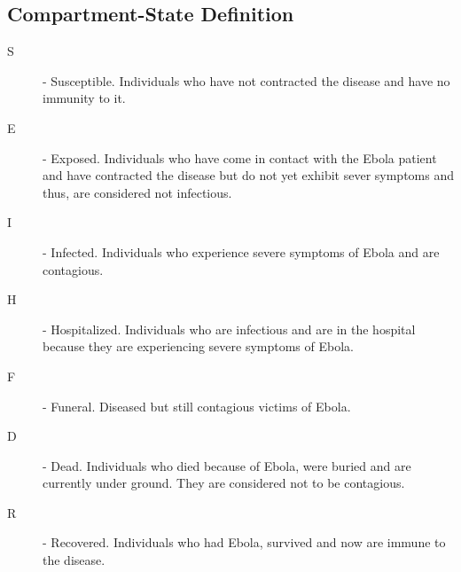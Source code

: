 \subsection{Compartment-State Definition}
\begin{description}
\item[S]- Susceptible. Individuals who have not contracted the disease and have no immunity to it. 
\item [E] - Exposed. Individuals who have come in contact with the Ebola patient and have contracted the disease but do not yet exhibit sever symptoms and thus, are considered not infectious.
\item [I] - Infected. Individuals who experience severe symptoms of Ebola and are contagious.
\item [H] - Hospitalized. Individuals who are infectious and are in the hospital because they are experiencing severe symptoms of Ebola.
\item[F] - Funeral. Diseased but still contagious victims of Ebola. 
\item[D] - Dead. Individuals who died because of Ebola, were buried and are currently under ground. They are considered not to be contagious.
\item [R] - Recovered. Individuals who had Ebola, survived and now are immune to the disease.
\end{description}

